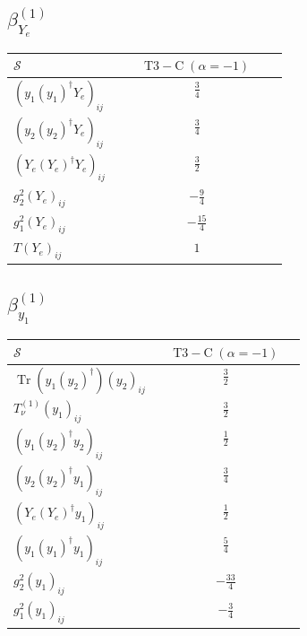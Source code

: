\documentclass[9pt]{article}
\begin{document}
\subsection*{$ \beta_{Y_e}^{(1)} $}
\begin{longtable}{@{}p{0.38\linewidth}c@{}}
\toprule
$\mathcal{S}$ & $ \mathrm{T3-C}\;(\alpha=-1) $ \\
\midrule
$ (y_1 (y_1)^{\dagger} Y_e)_{ij} $ & $ \frac{3}{4} $ \\
$ (y_2 (y_2)^{\dagger} Y_e)_{ij} $ & $ \frac{3}{4} $ \\
$ (Y_e (Y_e)^{\dagger} Y_e)_{ij} $ & $ \frac{3}{2} $ \\
$ g_2^2 (Y_e)_{ij} $ & $ - \frac{9}{4} $ \\
$ g_1^2 (Y_e)_{ij} $ & $ - \frac{15}{4} $ \\
$ T (Y_e)_{ij} $ & $ 1 $ \\
\bottomrule
\end{longtable}
\subsection*{$ \beta_{y_1}^{(1)} $}
\begin{longtable}{@{}p{0.38\linewidth}c@{}}
\toprule
$\mathcal{S}$ & $ \mathrm{T3-C}\;(\alpha=-1) $ \\
\midrule
$ \operatorname{Tr}\!(y_1 (y_2)^{\dagger}) (y_2)_{ij} $ & $ \frac{3}{2} $ \\
$ T_{\nu}^{(1)} (y_1)_{ij} $ & $ \frac{3}{2} $ \\
$ (y_1 (y_2)^{\dagger} y_2)_{ij} $ & $ \frac{1}{2} $ \\
$ (y_2 (y_2)^{\dagger} y_1)_{ij} $ & $ \frac{3}{4} $ \\
$ (Y_e (Y_e)^{\dagger} y_1)_{ij} $ & $ \frac{1}{2} $ \\
$ (y_1 (y_1)^{\dagger} y_1)_{ij} $ & $ \frac{5}{4} $ \\
$ g_2^2 (y_1)_{ij} $ & $ - \frac{33}{4} $ \\
$ g_1^2 (y_1)_{ij} $ & $ - \frac{3}{4} $ \\
\bottomrule
\end{longtable}
\end{document}
